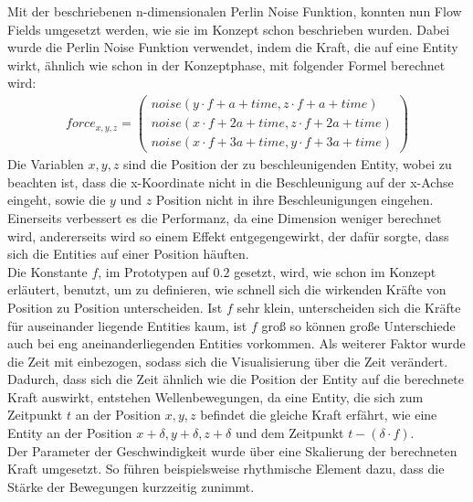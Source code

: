 \documentclass[11pt,a4paper]{article}
\begin{document}
\vspace{10pt}
\noindent
Mit der beschriebenen n-dimensionalen Perlin Noise Funktion, konnten nun Flow Fields umgesetzt werden, wie sie im Konzept schon beschrieben wurden. Dabei wurde die Perlin Noise Funktion verwendet, indem die Kraft, die auf eine Entity wirkt, ähnlich wie schon in der Konzeptphase, mit folgender Formel berechnet wird:
\begin{align}
force_{x,y,z} = \left(
\begin{array}{c}
noise(y \cdot f + a + time, z \cdot f + a + time) \\
noise(x \cdot f + 2a + time, z \cdot f + 2a + time) \\
noise(x \cdot f + 3a + time, y \cdot f + 3a + time)
\end{array}
\right)
\end{align}
\noindent
Die Variablen $x, y, z$ sind die Position der zu beschleunigenden Entity, wobei zu beachten ist, dass die x-Koordinate nicht in die Beschleunigung auf der x-Achse eingeht, sowie die $y$ und $z$ Position nicht in ihre Beschleunigungen eingehen. Einerseits verbessert es die Performanz, da eine Dimension weniger berechnet wird, andererseits wird so einem Effekt entgegengewirkt, der dafür sorgte, dass sich die Entities auf einer Position häuften.\\
Die Konstante $f$, im Prototypen auf $0.2$ gesetzt, wird, wie schon im Konzept erläutert, benutzt, um zu definieren, wie schnell sich die wirkenden Kräfte von Position zu Position unterscheiden. Ist $f$ sehr klein, unterscheiden sich die Kräfte für auseinander liegende Entities kaum, ist $f$ groß so können große Unterschiede auch bei eng aneinanderliegenden Entities vorkommen. Als weiterer Faktor wurde die Zeit mit einbezogen, sodass sich die Visualisierung über die Zeit verändert. Dadurch, dass sich die Zeit ähnlich wie die Position der Entity auf die berechnete Kraft auswirkt, entstehen Wellenbewegungen, da eine Entity, die sich zum Zeitpunkt $t$ an der Position $x, y, z$ befindet die gleiche Kraft erfährt, wie eine Entity an der Position $x+\delta, y+\delta, z+\delta$ und dem Zeitpunkt $t-(\delta \cdot f)$.\\
Der Parameter der Geschwindigkeit wurde über eine Skalierung der berechneten Kraft umgesetzt. So führen beispielsweise rhythmische Element dazu, dass die Stärke der Bewegungen kurzzeitig zunimmt.
\end{document}
